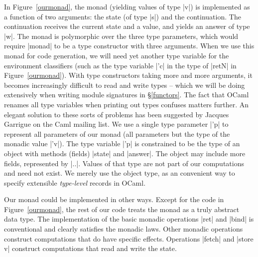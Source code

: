 \documentclass{elsart}
\begin{document}
In Figure~\ref{ourmonad}, the monad (yielding values of type |v|)
is implemented as a function of two
arguments: the state (of type |s|) and the continuation. The
continuation receives the current state and a value, and
yields an answer of type |w|.  The monad is polymorphic over the
three type parameters, which would require |monad| to be a type
constructor with three arguments. When we use this monad for code
generation, we will need yet another type variable for the environment
classifiers \cite{taha-environment} (such as the type variable |'c| 
in the type of |retN| in Figure~\ref{ourmonad}).
With type constructors taking more
and more arguments, it becomes increasingly difficult to read and write
types -- which we will be doing extensively when writing module
signatures in \S\ref{functors}. The fact that OCaml renames all type
variables when printing out types confuses matters further. An elegant
solution to these sorts of problems has been suggested by 
Jacques Garrigue on the Caml mailing list.
%
We use a single type parameter |'p| to
represent all parameters of our monad (all parameters but the type of
the monadic value |'v|). The type variable |'p| is constrained to be
the type of an object with methods (fields) |state| and |answer|. The
object may include more fields, represented by |..|. Values of that
type are not part of our computations and need not exist. We merely
use the object type, as an convenient way to specify extensible
\emph{type-level} records in OCaml.     

Our monad could be implemented in other ways. Except for the code in
Figure~\ref{ourmonad}, the rest of our code treats the monad as a
truly abstract data type. The implementation of the basic monadic
operations |ret| and |bind| is conventional and clearly satisfies the
monadic laws. Other monadic operations construct computations that do
have specific effects.  Operations |fetch| and |store v| construct
computations that read and write the state.
\end{document}
